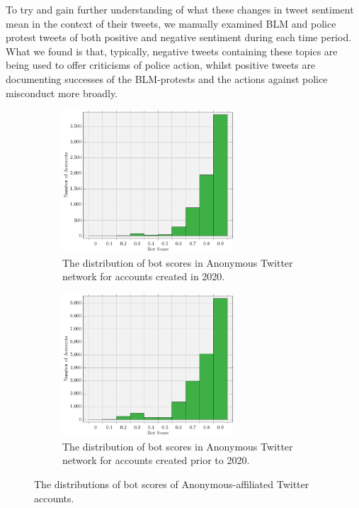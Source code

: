 \documentclass[letterpaper]{article}
\begin{document}
To try and gain further understanding of what these changes in tweet sentiment mean in the context of their tweets, we manually examined BLM and police protest tweets of both positive and negative sentiment during each time period. What we found is that, typically, negative tweets containing these topics are being used to offer criticisms of police action, whilst positive tweets are documenting successes of the BLM-protests and the actions against police misconduct more broadly.

\begin{figure}[!ht]
\centering
\begin{subfigure}[b]{0.45\textwidth}
     \centering
     \includegraphics[width=0.7\textwidth]{bot_scores_2020.pdf}
     \caption{The distribution of bot scores in Anonymous Twitter network for accounts created in 2020.}
     \label{fig:botScores2020}
\end{subfigure}
\begin{subfigure}[b]{0.45\textwidth}
    \centering
    \includegraphics[width=0.7\textwidth]{bot_scores_2019.pdf}
    \caption{The distribution of bot scores in Anonymous Twitter network for accounts created prior to 2020.}
    \label{fig:botScores2019}
\end{subfigure}
\caption{The distributions of bot scores of Anonymous-affiliated Twitter accounts.}
\label{fig:botScores}
\end{figure}
\end{document}
